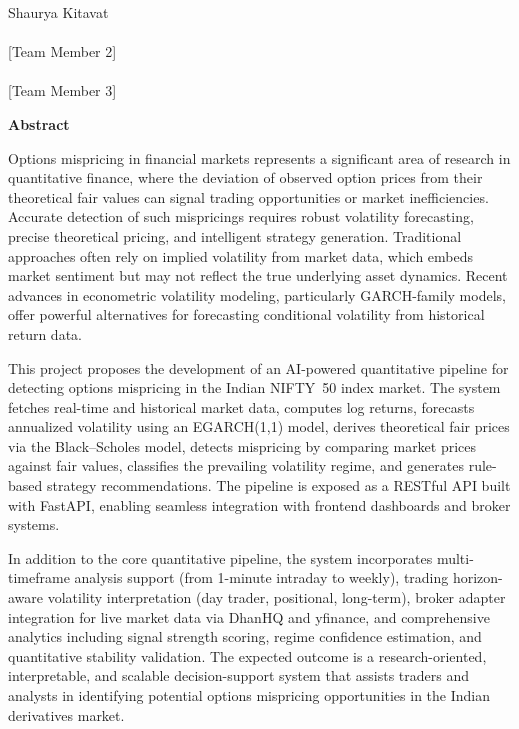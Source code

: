 \documentclass[12pt,a4paper]{article}
\begin{document}
\vspace{2cm}

Shaurya Kitavat\\
[Roll Number]\\[1cm]

[Team Member 2]\\
[Roll Number]\\[1cm]

[Team Member 3]\\
[Roll Number]

\newpage
\thispagestyle{fancy}
\begin{center}
{\Large \textbf{Abstract}}\\[1cm]
\end{center}

Options mispricing in financial markets represents a significant area of research in quantitative finance, where the deviation of observed option prices from their theoretical fair values can signal trading opportunities or market inefficiencies. Accurate detection of such mispricings requires robust volatility forecasting, precise theoretical pricing, and intelligent strategy generation. Traditional approaches often rely on implied volatility from market data, which embeds market sentiment but may not reflect the true underlying asset dynamics. Recent advances in econometric volatility modeling, particularly GARCH-family models, offer powerful alternatives for forecasting conditional volatility from historical return data.

This project proposes the development of an AI-powered quantitative pipeline for detecting options mispricing in the Indian NIFTY~50 index market. The system fetches real-time and historical market data, computes log returns, forecasts annualized volatility using an EGARCH(1,1) model, derives theoretical fair prices via the Black--Scholes model, detects mispricing by comparing market prices against fair values, classifies the prevailing volatility regime, and generates rule-based strategy recommendations. The pipeline is exposed as a RESTful API built with FastAPI, enabling seamless integration with frontend dashboards and broker systems.

In addition to the core quantitative pipeline, the system incorporates multi-timeframe analysis support (from 1-minute intraday to weekly), trading horizon-aware volatility interpretation (day trader, positional, long-term), broker adapter integration for live market data via DhanHQ and yfinance, and comprehensive analytics including signal strength scoring, regime confidence estimation, and quantitative stability validation. The expected outcome is a research-oriented, interpretable, and scalable decision-support system that assists traders and analysts in identifying potential options mispricing opportunities in the Indian derivatives market.
\end{document}
